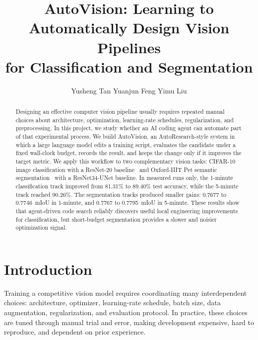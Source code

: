 \documentclass[10pt,twocolumn,letterpaper]{article}
\begin{document}
\title{AutoVision: Learning to Automatically Design Vision Pipelines\\
       for Classification and Segmentation}

\author{Yusheng Tan \hspace{1in} Yuanjun Feng \hspace{1in} Yimu Liu}
\maketitle

\begin{abstract}
Designing an effective computer vision pipeline usually requires
repeated manual choices about architecture, optimization,
learning-rate schedules, regularization, and preprocessing.
In this project, we study whether an AI coding agent can automate
part of that experimental process.
We build AutoVision, an AutoResearch-style system in which a large
language model edits a training script, evaluates the candidate under
a fixed wall-clock budget, records the result, and keeps the change
only if it improves the target metric.
We apply this workflow to two complementary vision tasks:
CIFAR-10 image classification with a ResNet-20 baseline~\cite{he2016deep}
and Oxford-IIIT Pet semantic segmentation~\cite{parkhi2012cats} with a
ResNet34-UNet baseline.
In measured runs only, the 1-minute classification track improved from
81.31\% to 89.40\% test accuracy, while the 5-minute track reached
90.26\%.
The segmentation tracks produced smaller gains: 0.7677 to 0.7746~mIoU
in 1-minute, and 0.7767 to 0.7795~mIoU in 5-minute.
These results show that agent-driven code search reliably discovers
useful local engineering improvements for classification, but
short-budget segmentation provides a slower and noisier optimization
signal.
\end{abstract}

\section{Introduction}

Training a competitive vision model requires coordinating many
interdependent choices: architecture, optimizer, learning-rate
schedule, batch size, data augmentation, regularization, and
evaluation protocol.
In practice, these choices are tuned through manual trial and error,
making development expensive, hard to reproduce, and dependent on
prior experience.
\end{document}
